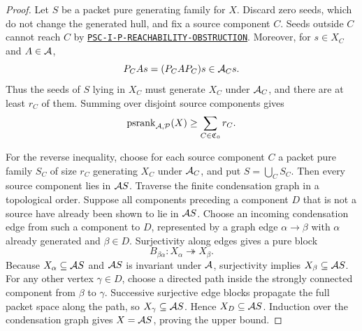 \begin{proof}
Let $S$ be a packet pure generating family for $X$.  Discard zero seeds, which do not change the generated hull, and fix a source component $C$.  Seeds outside $C$ cannot reach $C$ by \hyperref[rec:PSC-I-P-REACHABILITY-OBSTRUCTION]{\nolinkurl{PSC-I-P-REACHABILITY-OBSTRUCTION}}.  Moreover, for $s\in X_C$ and $A\in\mathcal A$,
\[
P_CAs=(P_CAP_C)s\in\mathcal A_Cs.
\]
Thus the seeds of $S$ lying in $X_C$ must generate $X_C$ under $\mathcal A_C$, and there are at least $r_C$ of them.  Summing over disjoint source components gives
\[
\operatorname{psrank}_{\mathcal A,\mathcal P}(X)
\geq
\sum_{C\in\mathfrak C_0}r_C.
\]

For the reverse inequality, choose for each source component $C$ a packet pure family $S_C$ of size $r_C$ generating $X_C$ under $\mathcal A_C$, and put $S=\bigcup_CS_C$.  Then every source component lies in $\mathcal A S$.  Traverse the finite condensation graph in a topological order.  Suppose all components preceding a component $D$ that is not a source have already been shown to lie in $\mathcal A S$.  Choose an incoming condensation edge from such a component to $D$, represented by a graph edge $\alpha\to\beta$ with $\alpha$ already generated and $\beta\in D$.  Surjectivity along edges gives a pure block
\[
B_{\beta\alpha}:X_\alpha\twoheadrightarrow X_\beta.
\]
Because $X_\alpha\subseteq\mathcal A S$ and $\mathcal A S$ is invariant under $\mathcal A$, surjectivity implies $X_\beta\subseteq\mathcal A S$.  For any other vertex $\gamma\in D$, choose a directed path inside the strongly connected component from $\beta$ to $\gamma$.  Successive surjective edge blocks propagate the full packet space along the path, so $X_\gamma\subseteq\mathcal A S$.  Hence $X_D\subseteq\mathcal A S$.  Induction over the condensation graph gives $X=\mathcal A S$, proving the upper bound.
\end{proof}
